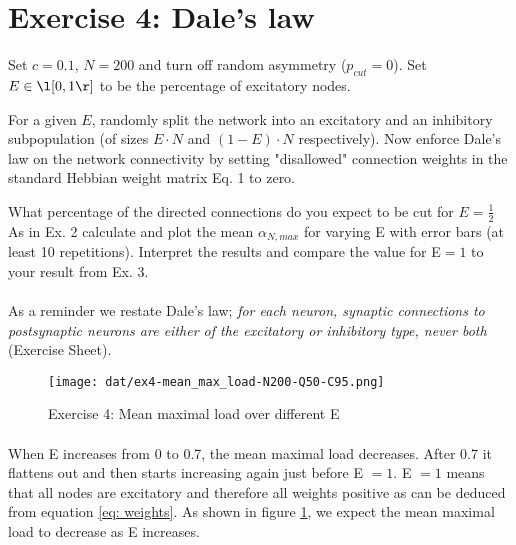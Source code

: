 \section{Exercise 4: Dale's law}

\begin{itshape}
\small
Set $c=0.1$, $N = 200$ and turn off random asymmetry ($p_{cut} = 0$). Set $E \in \l[0, 1\r]$ to be the percentage of excitatory nodes.

For a given $E$, randomly split the network into an excitatory and an inhibitory subpopulation (of sizes $E \cdot N$ and $(1 - E) \cdot N$ respectively). Now enforce Dale's law on the network connectivity by setting "disallowed" connection weights in the standard Hebbian weight matrix Eq. 1 to zero.

What percentage of the directed connections do you expect to be cut for $E = \frac{1}{2}$
As in Ex. 2 calculate and plot the mean $\alpha_{N,max}$ for varying E with error bars (at least 10 repetitions). Interpret the results and compare the value for E$ = 1$ to your result from Ex. 3.
\end{itshape}

\paragraph*{}

As a reminder we restate Dale's law; \textit{for each neuron, synaptic connections to postsynaptic neurons are either of the excitatory or inhibitory type, never both} (Exercise Sheet).

\begin{figure}[H]
  \begin{center}
    \texttt{[image: dat/ex4-mean\_max\_load-N200-Q50-C95.png]}
  \end{center}
  \vspace{-20pt}
  \caption{Exercise 4: Mean maximal load over different E}
  \label{fig: exercise 4}
\end{figure}

\paragraph*{}
When E increases from 0 to 0.7, the mean maximal load decreases. After 0.7 it flattens out and then starts increasing again just before E $= 1$. E $=1$ means that all nodes are excitatory and therefore all weights positive as can be deduced from equation \ref{eq: weights}. As shown in figure \ref{fig: exercise 4}, we expect the mean maximal load to decrease as E increases. 


